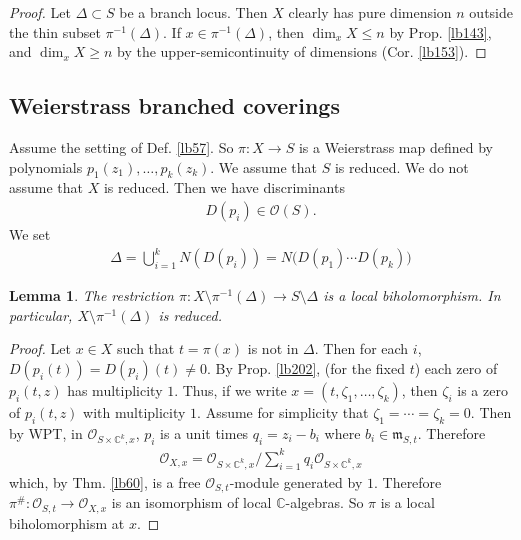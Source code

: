\documentclass[12pt,b5paper,notitlepage]{report}
\theoremstyle{definition}
\theoremstyle{plain}
\newtheorem{lm}[df]{Lemma}
\newcommand{\fk}{\mathfrak}
\newcommand{\scr}{\mathscr}
\newcommand{\Cbb}{\mathbb C}
\numberwithin{equation}{section}
\begin{document}
\begin{proof}
Let $\Delta\subset S$ be a branch locus. Then $X$ clearly has pure dimension $n$ outside the thin subset $\pi^{-1}(\Delta)$. If $x\in \pi^{-1}(\Delta)$, then $\dim_xX\leq n$ by Prop. \ref{lb143}, and $\dim_xX\geq n$ by the upper-semicontinuity of dimensions (Cor. \ref{lb153}).
\end{proof}











\subsection{Weierstrass branched coverings}



Assume the setting of Def. \ref{lb57}. So $\pi:X\rightarrow S$ is a Weierstrass map defined by polynomials $p_1(z_1),\dots,p_k(z_k)$. We assume that $S$ is reduced. We do not assume that $X$ is reduced. Then we have discriminants
\begin{align*}
D(p_i)\in\scr O(S).
\end{align*}
We set
\begin{align*}
\Delta=\bigcup_{i=1}^k N(D(p_i))=N\big(D(p_1)\cdots D(p_k)\big)
\end{align*}


\begin{lm}\label{lb204}
The restriction $\pi:X\setminus\pi^{-1}(\Delta)\rightarrow S\setminus\Delta$ is a local biholomorphism. In particular, $X\setminus\pi^{-1}(\Delta)$ is reduced.
\end{lm}


\begin{proof}
Let $x\in X$ such that $t=\pi(x)$ is not in $\Delta$. Then for each $i$, $D(p_i(t))=D(p_i)(t)\neq 0$. By Prop. \ref{lb202}, (for the fixed $t$) each zero of $p_i(t,z)$ has multiplicity $1$. Thus, if we write $x=(t,\zeta_1,\dots,\zeta_k)$, then $\zeta_i$ is a zero of $p_i(t,z)$ with multiplicity $1$. Assume for simplicity that $\zeta_1=\cdots=\zeta_k=0$. Then by WPT, in $\scr O_{S\times\Cbb^k,x}$, $p_i$ is a unit times $q_i=z_i-b_i$ where $b_i\in\fk m_{S,t}$. Therefore
\begin{align*}
\scr O_{X,x}=\scr O_{S\times\Cbb^k,x}\Big/\sum_{i=1}^k q_i\scr O_{S\times\Cbb^k,x}
\end{align*}
which, by Thm. \ref{lb60}, is a free $\scr O_{S,t}$-module generated by $1$. Therefore $\pi^\#:\scr O_{S,t}\rightarrow\scr O_{X,x}$ is an isomorphism of local $\Cbb$-algebras. So $\pi$ is a local biholomorphism at $x$. 
\end{proof}
\end{document}
